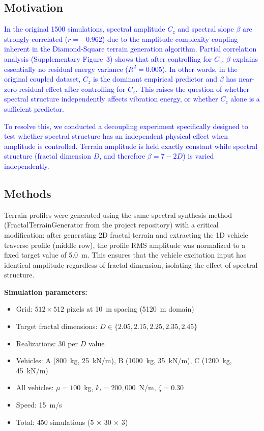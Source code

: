 \documentclass[11pt]{article}
\begin{document}
\subsection{Motivation}

\textcolor{blue}{In the original 1500 simulations, spectral amplitude $C_z$ and spectral slope $\beta$ are strongly correlated ($r = -0.962$) due to the amplitude-complexity coupling inherent in the Diamond-Square terrain generation algorithm. Partial correlation analysis (Supplementary Figure~3) shows that after controlling for $C_z$, $\beta$ explains essentially no residual energy variance ($R^2 = 0.005$). In other words, in the original coupled dataset, $C_z$ is the dominant empirical predictor and $\beta$ has near-zero residual effect after controlling for $C_z$. This raises the question of whether spectral structure independently affects vibration energy, or whether $C_z$ alone is a sufficient predictor.}

\textcolor{blue}{To resolve this, we conducted a decoupling experiment specifically designed to test whether spectral structure has an independent physical effect when amplitude is controlled. Terrain amplitude is held exactly constant while spectral structure (fractal dimension $D$, and therefore $\beta = 7-2D$) is varied independently.}

\subsection{Methods}

Terrain profiles were generated using the same spectral synthesis method (FractalTerrainGenerator from the project repository) with a critical modification: after generating 2D fractal terrain and extracting the 1D vehicle traverse profile (middle row), the profile RMS amplitude was normalized to a fixed target value of 5.0~m. This ensures that the vehicle excitation input has identical amplitude regardless of fractal dimension, isolating the effect of spectral structure.

\textbf{Simulation parameters:}
\begin{itemize}
\item Grid: $512 \times 512$ pixels at 10~m spacing (5120~m domain)
\item Target fractal dimensions: $D \in \{2.05, 2.15, 2.25, 2.35, 2.45\}$
\item Realizations: 30 per $D$ value
\item Vehicles: A (800~kg, 25~kN/m), B (1000~kg, 35~kN/m), C (1200~kg, 45~kN/m)
\item All vehicles: $\mu = 100$~kg, $k_t = 200{,}000$~N/m, $\zeta = 0.30$
\item Speed: 15~m/s
\item Total: 450 simulations (5 $\times$ 30 $\times$ 3)
\end{itemize}
\end{document}
